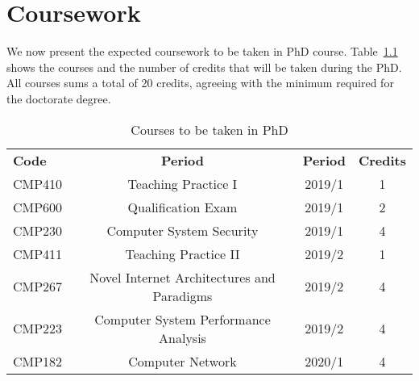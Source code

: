 \chapter{Coursework}\label{cap:coursework}
\thispagestyle{empty}

We now present the expected coursework to be taken in PhD course. Table~\ref{tab:phd-courses} shows the courses and the number of credits that will be taken during the PhD. All courses sums a total of 20 credits, agreeing with the minimum required for the doctorate degree.

\begin{table}[htp]
\centering
\begin{tabularx}{\textwidth}{ l | c | c | c}
\hline
{\bf Code} & {\bf Period} & \textbf{Period} & \textbf{Credits} \\ 
CMP410 & Teaching Practice I & 2019/1 & 1 \\
CMP600 & Qualification Exam & 2019/1 & 2 \\
CMP230 & Computer System Security & 2019/1 & 4 \\
CMP411 & Teaching Practice II & 2019/2 & 1 \\
CMP267 & Novel Internet Architectures and Paradigms & 2019/2 & 4 \\
CMP223 & Computer System Performance Analysis & 2019/2 & 4 \\
CMP182 & Computer Network & 2020/1 & 4 \\


\hline
\end{tabularx}
\caption{Courses to be taken in PhD}
\label{tab:phd-courses}
\end{table}


